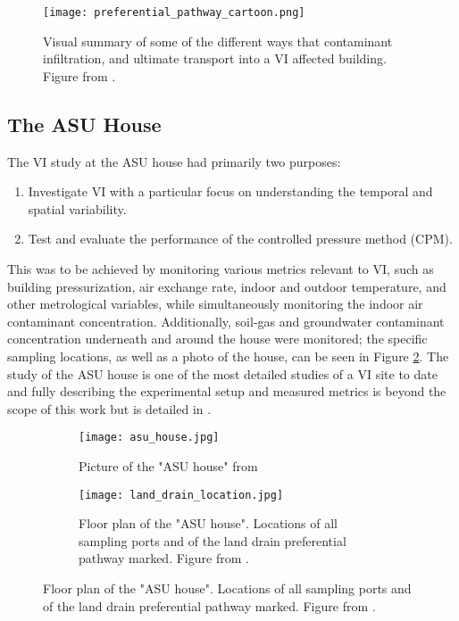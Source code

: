 \begin{figure}[htb!]
  \centering
  \texttt{[image: preferential\_pathway\_cartoon.png]}
  \caption{Visual summary of some of the different ways that contaminant infiltration, and ultimate transport into a VI affected building. Figure from \citeauthor{mchugh_evidence_2017}\cite{mchugh_evidence_2017}.}
  \label{fig:preferential_pathway_cartoon}
\end{figure}

\subsection{The ASU House}

The VI study at the ASU house had primarily two purposes:
\begin{enumerate}
  \item Investigate VI with a particular focus on understanding the temporal and spatial variability.
  \item Test and evaluate the performance of the controlled pressure method (CPM).
\end{enumerate}\par

This was to be achieved by monitoring various metrics relevant to VI, such as building pressurization, air exchange rate, indoor and outdoor temperature, and other metrological variables, while simultaneously monitoring the indoor air contaminant concentration.
Additionally, soil-gas and groundwater contaminant concentration underneath and around the house were monitored; the specific sampling locations, as well as a photo of the house, can be seen in Figure \ref{fig:asu_house}.
The study of the ASU house is one of the most detailed studies of a VI site to date and fully describing the experimental setup and measured metrics is beyond the scope of this work but is detailed in \citeauthor{holton_temporal_2013}\cite{holton_temporal_2013}.\par

\begin{figure}[htb!]
  \centering
  \begin{subfigure}[t]{0.45\textwidth}
    \texttt{[image: asu\_house.jpg]}
    \caption{Picture of the "ASU house" from \citeauthor{holton_temporal_2013}\cite{holton_temporal_2013}}
    \label{fig:asu_house}
  \end{subfigure}
  \begin{subfigure}[t]{0.50\textwidth}
    \centering
    \texttt{[image: land\_drain\_location.jpg]}
    \caption{Floor plan of the "ASU house". Locations of all sampling ports and of the land drain preferential pathway marked. Figure from \citeauthor{guo_identification_2015}\cite{guo_identification_2015}.}
    \label{fig:land_drain_location}
  \end{subfigure}
\end{figure}

